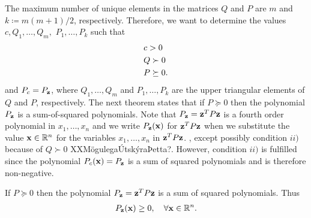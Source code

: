\documentclass[a4paper,12pt,twoside,BCOR=10mm]{scrbook}
\begin{document}
The maximum number of unique elements in the matrices $Q$ and $P$ are $m$ and $k \coloneqq m(m + 1) / 2$, respectively.
Therefore, we want to determine the values $c, Q_1, \ldots, Q_m,$ $P_1, \ldots, P_k$ such that
\begin{align*}
    &c > 0\\
    &Q
    \if{
    = \begin{pmatrix}
    Q_1 & Q_2 & \hdots & Q_n\\
    Q_2 & Q_{n + 1} & \hdots & Q_{2n-1}\\
    \vdots & \vdots & \ddots & \vdots\\
    Q_n & Q_{2n - 1} & \hdots & Q_{m}
    \end{pmatrix}
    }\fi
    \succ 0\\
    &P
    \if{
    = \begin{pmatrix}
    P_1 & P_2 & \hdots & P_m\\
    P_2 & P_{m + 1} & \hdots & P_{2m - 1}\\
    \vdots & \vdots & \ddots & \vdots\\
    P_m & P_{2m - 1} & \hdots & P_k
    \end{pmatrix}
    }\fi
    \succeq 0.
\end{align*}
and $P_c = P_{\mathbf{z}}$, where $Q_1, \ldots, Q_m$ and $P_1, \ldots, P_k$ are the upper triangular elements of $Q$ and $P$, respectively. The next theorem states that if $P \succeq 0$ then the polynomial $P_{\mathbf{z}}$ is a sum-of-squared polynomials. Note that $P_{\mathbf{z}} = \mathbf{z}^T P \mathbf{z}$ is a fourth order polynomial in $x_1, \ldots, x_n$ and we write $P_{\mathbf{z}}(\mathbf{x})$ for $\mathbf{z}^T P \mathbf{z}$ when we substitute the value $\mathbf{x} \in \mathbb{R}^{n}$ for the variables $x_1, \ldots, x_n$ in $\mathbf{z}^T P \mathbf{z}$.
\if, except possibly condition $ii)$ because of $Q \succ 0$ XXMögulegaÚtskýraÞetta?. However, condition $ii)$ is fulfilled since the polynomial $P_c(\mathbf{x}) = P_{\mathbf{z}}$ is a sum of squared polynomials and is therefore non-negative.
\fi
\begin{theorem}
If $P \succeq 0$ then the polynomial $P_{\mathbf{z}} = \mathbf{z}^T P \mathbf{z}$ is a sum of squared polynomials. Thus \begin{align*}
    P_{\mathbf{z}}(\mathbf{x}) \geq 0, \quad \forall \mathbf{x} \in \mathbb{R}^{n}.
\end{align*}
\end{theorem}
\end{document}
